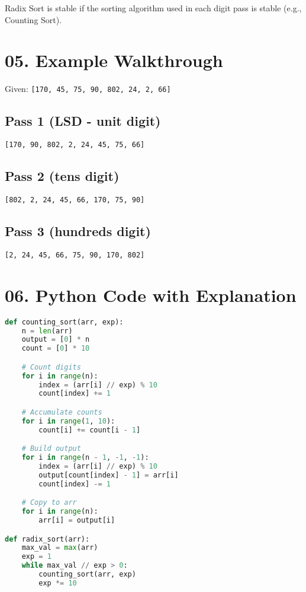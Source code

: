 \documentclass[14pt]{extarticle}
\begin{document}
\begin{tcolorbox}[
  colback=white,
  colframe=black,
  title=Stability Note
]
Radix Sort is stable if the sorting algorithm used in each digit pass is stable (e.g., Counting Sort).
\end{tcolorbox}

\section*{05. Example Walkthrough}

Given: \texttt{[170, 45, 75, 90, 802, 24, 2, 66]}

\subsection*{Pass 1 (LSD - unit digit)}
\texttt{[170, 90, 802, 2, 24, 45, 75, 66]}

\subsection*{Pass 2 (tens digit)}
\texttt{[802, 2, 24, 45, 66, 170, 75, 90]}

\subsection*{Pass 3 (hundreds digit)}
\texttt{[2, 24, 45, 66, 75, 90, 170, 802]}

\newpage
\section*{06. Python Code with Explanation}

\begin{lstlisting}[language=Python]
def counting_sort(arr, exp):
    n = len(arr)
    output = [0] * n
    count = [0] * 10

    # Count digits
    for i in range(n):
        index = (arr[i] // exp) % 10
        count[index] += 1

    # Accumulate counts
    for i in range(1, 10):
        count[i] += count[i - 1]

    # Build output
    for i in range(n - 1, -1, -1):
        index = (arr[i] // exp) % 10
        output[count[index] - 1] = arr[i]
        count[index] -= 1

    # Copy to arr
    for i in range(n):
        arr[i] = output[i]

def radix_sort(arr):
    max_val = max(arr)
    exp = 1
    while max_val // exp > 0:
        counting_sort(arr, exp)
        exp *= 10
\end{lstlisting}
\end{document}
